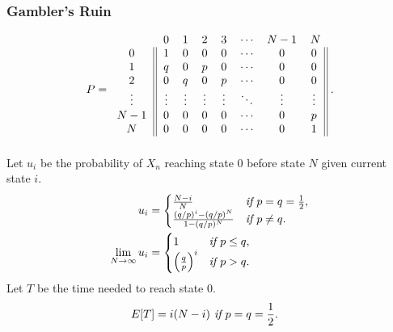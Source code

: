 \documentclass{article}
\begin{document}
\subsubsection{Gambler's Ruin}
\begin{align*}
    P = 
    \begin{blockarray}{cccccccc}
        & 0 & 1 & 2 & 3 & \cdots & N-1 & N \\
            \begin{block}{c||ccccccc||}
                0 & 1 & 0 & 0 & 0 & \cdots & 0 & 0 \\
                1 & q & 0 & p & 0 & \cdots & 0 & 0 \\
                2 & 0 & q & 0 & p & \cdots & 0 & 0 \\
                \vdots & \vdots & \vdots & \vdots & \vdots & \ddots & \vdots & \vdots\\
                N-1 & 0 & 0 & 0 & 0 & \cdots & 0 & p \\
                N & 0 & 0 & 0 & 0 & \cdots & 0 & 1 \\
            \end{block} 
        \end{blockarray}\; .
\end{align*}
Let $u_i$ be the probability of $X_n$ reaching state 0 before state $N$ given current state $i$.
\begin{align*}
    u_i & = \begin{cases}
        \frac{N-i}{N} & \emph{if } p = q = \frac{1}{2}, \\
        \frac{(q/p)^i-(q/p)^N}{1-(q/p)^N} & \emph{if } p \neq q.
    \end{cases} \\
    \lim_{N\rightarrow\infty} u_i & = \begin{cases}
        1 & \emph{if } p \le q, \\
        \left(\frac{q}{p}\right)^i & \emph{if } p > q.
    \end{cases}
\end{align*}
Let $T$ be the time needed to reach state 0.
\begin{align*}
    E[T] & = i(N-i) \emph{ if } p = q = \frac{1}{2}.
\end{align*}
\end{document}
